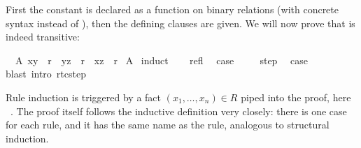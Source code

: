 \begin{isabellebody}
\begin{isamarkuptext}%
\noindent
First the constant is declared as a function on binary
relations (with concrete syntax  instead of ), then the defining clauses are given. We will now prove that
 is indeed transitive:%
\end{isamarkuptext}%
\isamarkuptrue%
\isamarkupfalse%
\ \ A{}\ {}{}x{}y{}\ {}\ r{}{}\ \ {}{}y{}z{}\ {}\ r{}\ {}\ {}x{}z{}\ {}\ r{}{}\isanewline
%
\isadelimproof
%
\endisadelimproof
%
\isatagproof
{}\isamarkupfalse%
\ A\isanewline
{}\isamarkupfalse%
\ induct\isanewline
\ \ \isamarkupfalse%
\ refl\ \isamarkupfalse%
\ {}case\ \isamarkupfalse%
\isanewline
{}\isamarkupfalse%
\isanewline
\ \ \isamarkupfalse%
\ step\ \isamarkupfalse%
\ {}case\ \isamarkupfalse%
{}blast\ intro{}\ rtc{}step{}\isanewline
{}\isamarkupfalse%
%
\endisatagproof
{\isafoldproof}%
%
\isadelimproof
%
\endisadelimproof
%
\begin{isamarkuptext}%
\noindent Rule induction is triggered by a fact $(x_1,\dots,x_n)
\in R$ piped into the proof, here ~. The
proof itself follows the inductive definition very
closely: there is one case for each rule, and it has the same name as
the rule, analogous to structural induction.


\end{isamarkuptext}
\end{isabellebody}

